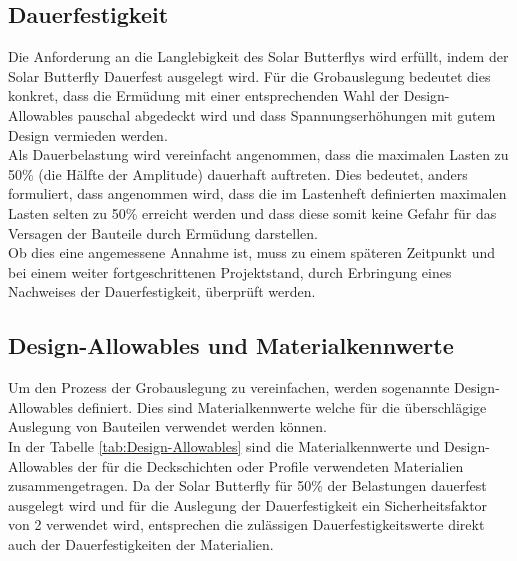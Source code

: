 \subsection{Dauerfestigkeit}
Die Anforderung an die Langlebigkeit des Solar Butterflys wird erfüllt, indem der Solar Butterfly Dauerfest ausgelegt wird. Für die Grobauslegung bedeutet dies konkret, dass die Ermüdung mit einer entsprechenden Wahl der Design-Allowables pauschal abgedeckt wird und dass Spannungserhöhungen mit gutem Design vermieden werden.\\
Als Dauerbelastung wird vereinfacht angenommen, dass die maximalen Lasten zu 50\% (die Hälfte der Amplitude) dauerhaft auftreten. Dies bedeutet, anders formuliert, dass angenommen wird, dass die im Lastenheft definierten maximalen Lasten selten zu 50\% erreicht werden und dass diese somit keine Gefahr für das Versagen der Bauteile durch Ermüdung darstellen.\\
Ob dies eine angemessene Annahme ist, muss zu einem späteren Zeitpunkt und bei einem weiter fortgeschrittenen Projektstand, durch Erbringung eines Nachweises der Dauerfestigkeit, überprüft werden.
\newpage

\subsection{Design-Allowables und Materialkennwerte}
Um den Prozess der Grobauslegung zu vereinfachen, werden sogenannte Design-Allowables definiert. Dies sind Materialkennwerte welche für die überschlägige Auslegung von Bauteilen verwendet werden können.\\
In der Tabelle \ref{tab:Design-Allowables} sind die Materialkennwerte und Design-Allowables der für die Deckschichten oder Profile verwendeten Materialien zusammengetragen. Da der Solar Butterfly für 50\% der Belastungen dauerfest ausgelegt wird und für die Auslegung der Dauerfestigkeit ein Sicherheitsfaktor von 2 verwendet wird, entsprechen die zulässigen Dauerfestigkeitswerte direkt auch der Dauerfestigkeiten der Materialien.

